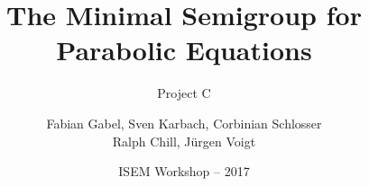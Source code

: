 \title[Project C -- Minimal Semigroup]{The Minimal Semigroup for Parabolic Equations}
\subtitle[short version]{Project C}
\date[2017]{ISEM Workshop -- 2017}
\author[F. Gabel, S. Karbach, C. Schlosser]{Fabian Gabel, Sven Karbach, Corbinian Schlosser \\ Ralph Chill, Jürgen Voigt}
